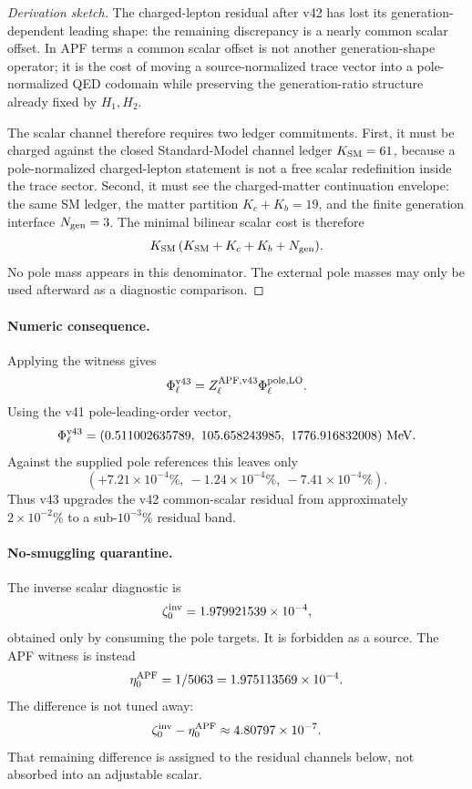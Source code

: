 \begin{proof}[Derivation sketch]
The charged-lepton residual after v42 has lost its generation-dependent leading shape: the remaining discrepancy is a nearly common scalar offset.  In APF terms a common scalar offset is not another generation-shape operator; it is the cost of moving a source-normalized trace vector into a pole-normalized QED codomain while preserving the generation-ratio structure already fixed by $H_1,H_2$.

The scalar channel therefore requires two ledger commitments.  First, it must be charged against the closed Standard-Model channel ledger $K_{\rm SM}=61$, because a pole-normalized charged-lepton statement is not a free scalar redefinition inside the trace sector.  Second, it must see the charged-matter continuation envelope: the same SM ledger, the matter partition $K_c+K_b=19$, and the finite generation interface $N_{\rm gen}=3$.  The minimal bilinear scalar cost is therefore
\[
K_{\rm SM}\,(K_{\rm SM}+K_c+K_b+N_{\rm gen}).
\]
No pole mass appears in this denominator.  The external pole masses may only be used afterward as a diagnostic comparison.
\end{proof}

\paragraph{Numeric consequence.}
Applying the witness gives
\[
\Phi_\ell^{\rm v43}
=Z_\ell^{\rm APF,v43}\Phi_\ell^{\rm pole,LO}.
\]
Using the v41 pole-leading-order vector,
\[
\Phi_\ell^{\rm v43}
=(0.511002635789,\ 105.658243985,\ 1776.916832008)\ {\rm MeV}.
\]
Against the supplied pole references this leaves only
\[
(+7.21\times10^{-4}\%,\ -1.24\times10^{-4}\%,\ -7.41\times10^{-4}\%).
\]
Thus v43 upgrades the v42 common-scalar residual from approximately $2\times10^{-2}\%$ to a sub-$10^{-3}\%$ residual band.

\paragraph{No-smuggling quarantine.}
The inverse scalar diagnostic is
\[
\zeta_0^{\rm inv}=1.979921539\times10^{-4},
\]
obtained only by consuming the pole targets.  It is forbidden as a source.  The APF witness is instead
\[
\eta_0^{\rm APF}=1/5063=1.975113569\times10^{-4}.
\]
The difference is not tuned away:
\[
\zeta_0^{\rm inv}-\eta_0^{\rm APF}\approx 4.80797\times10^{-7}.
\]
That remaining difference is assigned to the residual channels below, not absorbed into an adjustable scalar.

